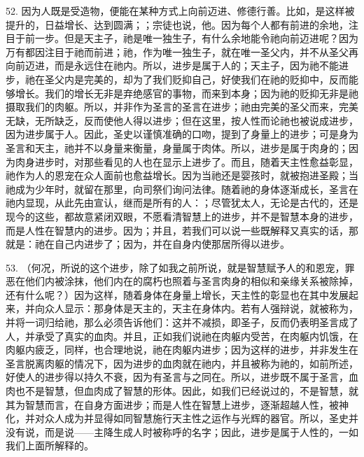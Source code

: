 52. 因为人既是受造物，便能在某种方式上向前迈进、修德行善。比如，是这样被提升的，日益增长、达到圆满；；宗徒也说，他。因为每个人都有前进的余地，注目于前一步。但是天主子，祂是唯一独生子，有什么余地能令祂向前迈进呢？因为万有都因注目于祂而前进；祂，作为唯一独生子，就在唯一圣父内，并不从圣父再向前迈进，而是永远住在祂内。所以，进步是属于人的；天主子，因为祂不能进步，祂在圣父内是完美的，却为了我们贬抑自己，好使我们在祂的贬抑中，反而能够增长。我们的增长无非是弃绝感官的事物，而来到本身；因为祂的贬抑无非是祂摄取我们的肉躯。所以，并非作为圣言的圣言在进步；祂由完美的圣父而来，完美无缺，无所缺乏，反而使他人得以进步；但在这里，按人性而论祂也被说成进步，因为进步属于人。因此，圣史以谨慎准确的口吻，提到了身量上的进步；可是身为圣言和天主，祂并不以身量来衡量，身量属于肉体。所以，进步是属于肉身的；因为肉身进步时，对那些看见的人也在显示上进步了。而且，随着天主性愈益彰显，祂作为人的恩宠在众人面前也愈益增长。因为当祂还是婴孩时，就被抱进圣殿；当祂成为少年时，就留在那里，向司祭们询问法律。随着祂的身体逐渐成长，圣言在祂内显现，从此先由宣认，继而是所有的人：；尽管犹太人，无论是古代的，还是现今的这些，都故意紧闭双眼，不愿看清智慧上的进步，并不是智慧本身的进步，而是人性在智慧内的进步。因为；并且，若我们可以说一些既解释又真实的话，那就是：祂在自己内进步了；因为，并在自身内使那居所得以进步。\par

53. （何况，所说的这个进步，除了如我之前所说，就是智慧赋予人的和恩宠，罪恶在他们内被涂抹，他们内在的腐朽也照着与圣言肉身的相似和亲缘关系被除掉，还有什么呢？）因为这样，随着身体在身量上增长，天主性的彰显也在其中发展起来，并向众人显示：那身体是天主的，天主在身体内。若有人强辩说，就被称为，并将一词归给祂，那么必须告诉他们：这并不减损，即圣子，反而仍表明圣言成了人，并承受了真实的血肉。并且，正如我们说祂在肉躯内受苦，在肉躯内饥饿，在肉躯内疲乏，同样，也合理地说，祂在肉躯内进步；因为这样的进步，并非发生在圣言脱离肉躯的情况下，因为进步的血肉就在祂内，并且被称为祂的，如前所述，好使人的进步得以持久不衰，因为有圣言与之同在。所以，进步既不属于圣言，血肉也不是智慧，但血肉成了智慧的形体。因此，如我们已经说过的，不是智慧，就其为智慧而言，在自身方面进步；而是人性在智慧上进步，逐渐超越人性，被神化，并对众人成为并显得如同智慧施行天主性之运作与光辉的器官。所以，圣史并没有说，而是说——主降生成人时被称呼的名字；因此，进步是属于人性的，一如我们上面所解释的。\par

